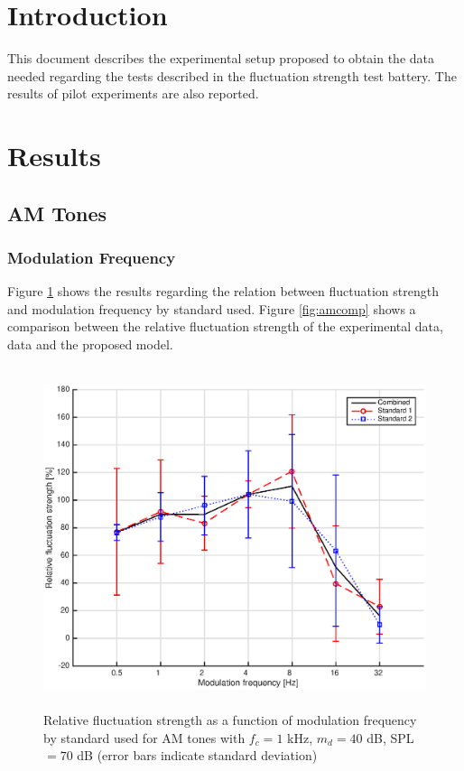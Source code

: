 \documentclass[a4paper]{article}
\begin{document}

\section{Introduction}

This document describes the experimental setup proposed to obtain the data
needed regarding the tests described in the fluctuation strength test battery.
The results of pilot experiments are also reported.

\section{Results}

\subsection{AM Tones}

\subsubsection{Modulation Frequency}

Figure \ref{fig:amstds} shows the results regarding the relation between
fluctuation strength and modulation frequency by standard used. Figure
\ref{fig:amcomp} shows a comparison between the relative fluctuation strength
of the experimental data, \citeauthor{Fastl2007Psychoacoustics} data and the
proposed model.

\begin{figure}[ht]
    \centering
    \includegraphics[height=10cm]{img/AM_tones-fm-results-All-standards}
    \caption{Relative fluctuation strength as a function of modulation
        frequency by standard used for AM tones with $f_c = 1$ kHz, $m_d = 40$
        dB, SPL $= 70$ dB (error bars indicate standard deviation)}
    \label{fig:amstds}
\end{figure}
\end{document}
